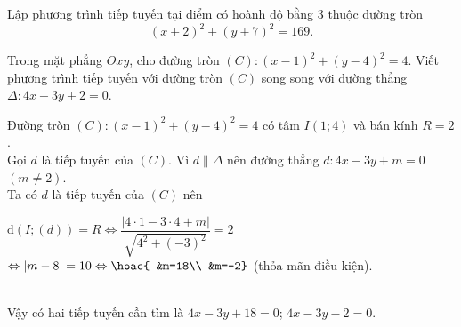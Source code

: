 \begin{bt}%
	Lập phương trình tiếp tuyến tại điểm có hoành độ bằng $ 3 $ thuộc đường tròn $$ (x+2)^2+(y+7)^2=169.$$
\end{bt}

\begin{bt}%
	Trong mặt phẳng $Oxy$, cho đường tròn $(C)\colon \left(x-1\right)^2+\left(y-4\right)^2=4$. Viết phương trình tiếp tuyến với đường tròn $(C)$ song song với đường thẳng $\Delta\colon 4x-3y+2=0$.
	\loigiai
	{
		Đường tròn $(C)\colon \left(x-1\right)^2+\left(y-4\right)^2=4$ có tâm $I(1;4)$ và bán kính $R=2$.\\
		Gọi $d$ là tiếp tuyến của $(C)$. Vì $d\parallel\Delta$ nên đường thẳng $d\colon 4x-3y+m=0$ $(m\neq2)$.\\
		Ta có $d$ là tiếp tuyến của $(C)$ nên \\
		\centerline{$\mathrm{d}(I;(d))=R\Leftrightarrow\dfrac{|4\cdot1-3\cdot4+m|}{\sqrt{4^2+\left(-3\right)^2}}=2$ \\
			$\Leftrightarrow |m-8|=10\Leftrightarrow \hoac{
				&m=18\\
				&m=-2}$ (thỏa mãn điều kiện).}\\
		Vậy có hai tiếp tuyến cần tìm là $4x-3y+18=0$; $4x-3y-2=0$.
	}
\end{bt}

